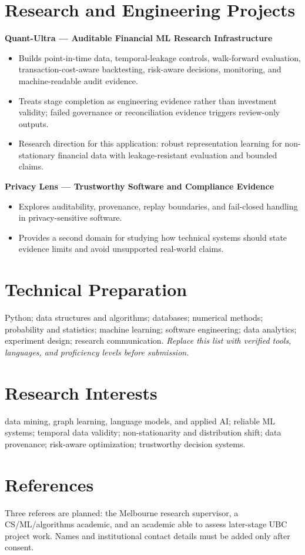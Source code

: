 \documentclass[11pt]{article}
\begin{document}
\section*{Research and Engineering Projects}
\textbf{Quant-Ultra --- Auditable Financial ML Research Infrastructure}
\begin{itemize}
\item Builds point-in-time data, temporal-leakage controls, walk-forward evaluation, transaction-cost-aware backtesting, risk-aware decisions, monitoring, and machine-readable audit evidence.
\item Treats stage completion as engineering evidence rather than investment validity; failed governance or reconciliation evidence triggers review-only outputs.
\item Research direction for this application: robust representation learning for non-stationary financial data with leakage-resistant evaluation and bounded claims.
\end{itemize}

\textbf{Privacy Lens --- Trustworthy Software and Compliance Evidence}
\begin{itemize}
\item Explores auditability, provenance, replay boundaries, and fail-closed handling in privacy-sensitive software.
\item Provides a second domain for studying how technical systems should state evidence limits and avoid unsupported real-world claims.
\end{itemize}

\section*{Technical Preparation}
Python; data structures and algorithms; databases; numerical methods; probability and statistics; machine learning; software engineering; data analytics; experiment design; research communication. \textit{Replace this list with verified tools, languages, and proficiency levels before submission.}

\section*{Research Interests}
data mining, graph learning, language models, and applied AI; reliable ML systems; temporal data validity; non-stationarity and distribution shift; data provenance; risk-aware optimization; trustworthy decision systems.

\section*{References}
Three referees are planned: the Melbourne research supervisor, a CS/ML/algorithms academic, and an academic able to assess later-stage UBC project work. Names and institutional contact details must be added only after consent.
\end{document}
